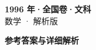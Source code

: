 \documentclass[zihao=-4, a4paper]{ctexart}
\begin{document}
\begin{center}
  {\Large\bfseries 1996 年·全国卷·文科}\\[4pt]
  {\large 数学 · 解析版}
\end{center}
\medskip
{}

\clearpage
{}
\begin{center}{\Large\bfseries 参考答案与详细解析}\end{center}
\medskip

\end{document}
